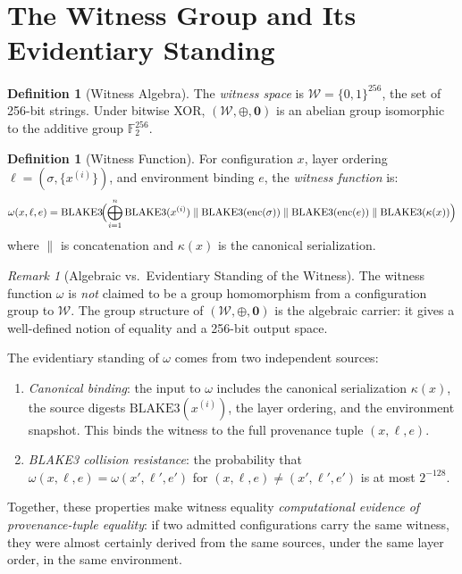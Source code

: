 \documentclass[12pt, letterpaper]{report}
\theoremstyle{plain}
\theoremstyle{definition}
\newtheorem{definition}[theorem]{Definition}
\theoremstyle{remark}
\newtheorem{remark}[theorem]{Remark}
\newcommand{\W}{\mathcal{W}}
\begin{document}
\section{The Witness Group and Its Evidentiary Standing}

\begin{definition}[Witness Algebra]
\label{def:witness-algebra}
The \emph{witness space} is $\W = \{0,1\}^{256}$,
the set of 256-bit strings.
Under bitwise XOR, $(\W, \oplus, \bm{0})$ is an abelian group
isomorphic to the additive group $\mathbb{F}_2^{256}$.
\end{definition}

\begin{definition}[Witness Function]
\label{def:witness}
For configuration $x$, layer ordering $\ell = (\sigma, \{x^{(i)}\})$,
and environment binding $e$, the \emph{witness function} is:
\[
  \omega(x, \ell, e) = \mathrm{BLAKE3}\!\Bigl(
    \bigoplus_{i=1}^{n} \mathrm{BLAKE3}(x^{(i)})
    \;\|\; \mathrm{BLAKE3}(\mathrm{enc}(\sigma))
    \;\|\; \mathrm{BLAKE3}(\mathrm{enc}(e))
    \;\|\; \mathrm{BLAKE3}(\kappa(x))
  \Bigr)
\]
where $\|$ is concatenation and $\kappa(x)$ is the canonical serialization.
\end{definition}

\begin{remark}[Algebraic vs.\ Evidentiary Standing of the Witness]
\label{rem:witness-standing}
The witness function $\omega$ is \emph{not} claimed to be a group
homomorphism from a configuration group to $\W$.
The group structure of $(\W, \oplus, \bm{0})$ is the algebraic carrier:
it gives a well-defined notion of equality and a 256-bit output space.

The evidentiary standing of $\omega$ comes from two independent sources:
\begin{enumerate}
  \item \emph{Canonical binding}: the input to $\omega$ includes
        the canonical serialization $\kappa(x)$, the source digests
        $\mathrm{BLAKE3}(x^{(i)})$, the layer ordering, and the
        environment snapshot. This binds the witness to the full provenance
        tuple $(x, \ell, e)$.
  \item \emph{BLAKE3 collision resistance}: the probability that
        $\omega(x,\ell,e) = \omega(x',\ell',e')$ for
        $(x,\ell,e) \neq (x',\ell',e')$ is at most $2^{-128}$.
\end{enumerate}
Together, these properties make witness equality \emph{computational evidence
of provenance-tuple equality}: if two admitted configurations carry the same
witness, they were almost certainly derived from the same sources, under
the same layer order, in the same environment.
\end{remark}
\end{document}
